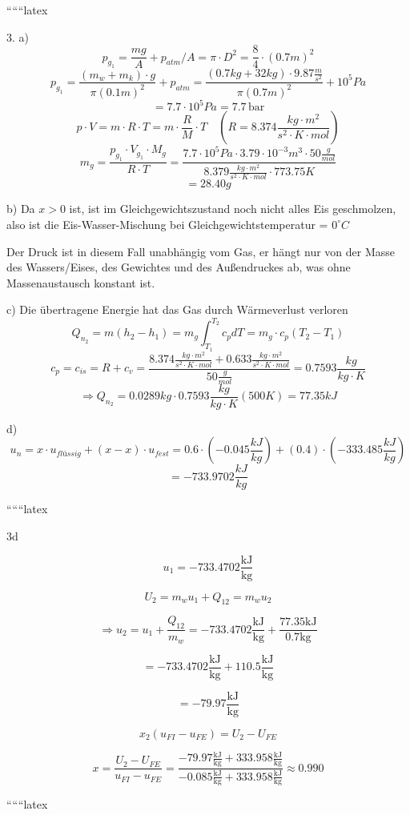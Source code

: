 
``````latex


3. a) 
\[
p_{g_1} = \frac{mg}{A} + p_{atm} / A = \pi \cdot D^2 = \frac{8}{4} \cdot (0.7m)^2
\]
\[
p_{g_1} = \frac{(m_w + m_k) \cdot g}{\pi (0.1m)^2} + p_{atm} = \frac{(0.7kg + 32kg) \cdot 9.87 \frac{m}{s^2}}{\pi (0.7m)^2} + 10^5 Pa
\]
\[
= 7.7 \cdot 10^5 Pa = 7.7 \, \text{bar}
\]
\[
p \cdot V = m \cdot R \cdot T = m \cdot \frac{R}{M} \cdot T \quad \left( R = 8.374 \frac{kg \cdot m^2}{s^2 \cdot K \cdot mol} \right)
\]
\[
m_g = \frac{p_{g_1} \cdot V_{g_1} \cdot M_g}{R \cdot T} = \frac{7.7 \cdot 10^5 Pa \cdot 3.79 \cdot 10^{-3} m^3 \cdot 50 \frac{g}{mol}}{8.379 \frac{kg \cdot m^2}{s^2 \cdot K \cdot mol} \cdot 773.75 K}
\]
\[
= 28.40 g
\]

b) Da \( x > 0 \) ist, ist im Gleichgewichtszustand noch nicht alles Eis geschmolzen, also ist die Eis-Wasser-Mischung bei Gleichgewichtstemperatur = \( 0^\circ C \)

Der Druck ist in diesem Fall unabhängig vom Gas, er hängt nur von der Masse des Wassers/Eises, des Gewichtes und des Außendruckes ab, was ohne Massenaustausch konstant ist.

c) Die übertragene Energie hat das Gas durch Wärmeverlust verloren
\[
Q_{n_2} = m(h_2 - h_1) = m_g \int_{T_1}^{T_2} c_p dT = m_g \cdot c_p (T_2 - T_1)
\]
\[
c_p = c_{is} = R + c_v = \frac{8.374 \frac{kg \cdot m^2}{s^2 \cdot K \cdot mol} + 0.633 \frac{kg \cdot m^2}{s^2 \cdot K \cdot mol}}{50 \frac{g}{mol}} = 0.7593 \frac{kg}{kg \cdot K}
\]
\[
\Rightarrow Q_{n_2} = 0.0289 kg \cdot 0.7593 \frac{kg}{kg \cdot K} (500 K) = 77.35 kJ
\]

d) 
\[
u_n = x \cdot u_{flüssig} + (x - x) \cdot u_{fest} = 0.6 \cdot (-0.045 \frac{kJ}{kg}) + (0.4) \cdot (-333.485 \frac{kJ}{kg})
\]
\[
= -733.9702 \frac{kJ}{kg}
\]

``````latex

3d

\[
u_1 = -733.4702 \frac{\text{kJ}}{\text{kg}}
\]

\[
U_2 = m_{w} u_1 + Q_{12} = m_{w} u_2
\]

\[
\Rightarrow u_2 = u_1 + \frac{Q_{12}}{m_{w}} = -733.4702 \frac{\text{kJ}}{\text{kg}} + \frac{77.35 \text{kJ}}{0.7 \text{kg}}
\]

\[
= -733.4702 \frac{\text{kJ}}{\text{kg}} + 110.5 \frac{\text{kJ}}{\text{kg}}
\]

\[
= -79.97 \frac{\text{kJ}}{\text{kg}}
\]

\[
x_2 (u_{FI} - u_{FE}) = U_2 - U_{FE}
\]

\[
x = \frac{U_2 - U_{FE}}{u_{FI} - u_{FE}} = \frac{-79.97 \frac{\text{kJ}}{\text{kg}} + 333.958 \frac{\text{kJ}}{\text{kg}}}{-0.085 \frac{\text{kJ}}{\text{kg}} + 333.958 \frac{\text{kJ}}{\text{kg}}} \approx 0.990
\]

``````latex



